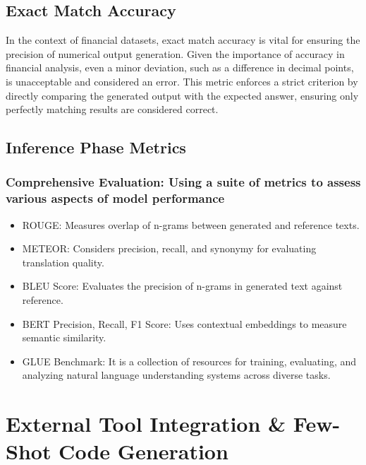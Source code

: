 \documentclass[logo,msc]{infthesis}           %
\begin{document}
\subsection{Exact Match Accuracy}
In the context of financial datasets, exact match accuracy is vital for ensuring the precision of numerical output generation. Given the importance of accuracy in financial analysis, even a minor deviation, such as a difference in decimal points, is unacceptable and considered an error. This metric enforces a strict criterion by directly comparing the generated output with the expected answer, ensuring only perfectly matching results are considered correct. 
\subsection{Inference Phase Metrics}
\subsubsection{Comprehensive Evaluation: Using a suite of metrics to assess various aspects of model performance}
\begin{itemize}
    \item ROUGE: Measures overlap of n-grams between generated and reference texts.
    \item METEOR: Considers precision, recall, and synonymy for evaluating translation quality.
    \item BLEU Score: Evaluates the precision of n-grams in generated text against reference.
    \item BERT Precision, Recall, F1 Score: Uses contextual embeddings to measure semantic similarity.
    \item GLUE Benchmark: It is a collection of resources for training, evaluating, and analyzing natural language understanding systems across diverse tasks.
\end{itemize}
\section{External Tool Integration \& Few-Shot Code Generation}
\end{document}
